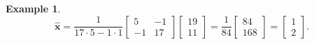\documentclass[
]{book}
\theoremstyle{definition}
\theoremstyle{definition}
\newtheorem{example}{Example}[chapter]
\theoremstyle{definition}
\theoremstyle{definition}
\theoremstyle{remark}
\begin{document}
\begin{examplebox}
\begin{example}
\[\hat{\mathbf{x}}=\frac{1}{17\cdot 5-1\cdot 1}\begin{bmatrix}5 & -1\\-1 & 17\end{bmatrix}\begin{bmatrix}19\\11\end{bmatrix}=\frac{1}{84}\begin{bmatrix}84\\168\end{bmatrix}=\begin{bmatrix}1\\2\end{bmatrix}.\]
\end{example}

\end{examplebox}
\end{document}
